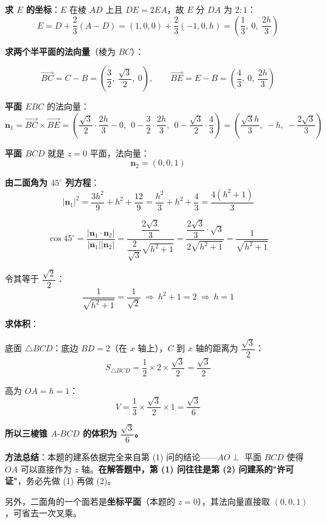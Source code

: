 \begin{answer}
\textbf{求 $E$ 的坐标}：$E$ 在棱 $AD$ 上且 $DE=2EA$，故 $E$ 分 $DA$ 为 $2:1$：
\nopagebreak[4]
\[E=D+\frac23\left(A-D\right)=(1,0,0)+\frac23(-1,0,h)=\left(\frac13,\ 0,\ \frac{2h}3\right)\]

\textbf{求两个半平面的法向量}（棱为 $BC$）：

\nopagebreak[4]
\[\overrightarrow{BC}=C-B=\left(\frac32,\ \frac{\sqrt3}2,\ 0\right),\qquad \overrightarrow{BE}=E-B=\left(\frac43,\ 0,\ \frac{2h}3\right)\]

\textbf{平面 $EBC$} 的法向量：
\nopagebreak[4]
\[\boldsymbol n_1=\overrightarrow{BC}\times\overrightarrow{BE}=\left(\frac{\sqrt3}2\cdot\frac{2h}3-0,\ \ 0-\frac32\cdot\frac{2h}3,\ \ 0-\frac{\sqrt3}2\cdot\frac43\right)=\left(\frac{\sqrt3h}3,\ -h,\ -\frac{2\sqrt3}3\right)\]

\textbf{平面 $BCD$} 就是 $z=0$ 平面，法向量：
\nopagebreak[4]
\[\boldsymbol n_2=(0,0,1)\]

\textbf{由二面角为 $45^\circ$ 列方程}：
\nopagebreak[4]
\[\left|\boldsymbol n_1\right|^{2}=\frac{3h^{2}}9+h^{2}+\frac{12}9=\frac{h^{2}}3+h^{2}+\frac43=\frac{4\left(h^{2}+1\right)}3\]

\nopagebreak[4]
\[\cos45^\circ=\frac{\left|\boldsymbol n_1\cdot\boldsymbol n_2\right|}{\left|\boldsymbol n_1\right|\left|\boldsymbol n_2\right|}=\frac{\dfrac{2\sqrt3}3}{\dfrac2{\sqrt3}\sqrt{h^{2}+1}}=\frac{\dfrac{2\sqrt3}3\cdot\sqrt3}{2\sqrt{h^{2}+1}}=\frac{1}{\sqrt{h^{2}+1}}\]

令其等于 $\dfrac{\sqrt2}2$：
\nopagebreak[4]
\[\frac1{\sqrt{h^{2}+1}}=\frac1{\sqrt2}\ \Longrightarrow\ h^{2}+1=2\ \Longrightarrow\ h=1\]

\textbf{求体积}：

底面 $\triangle BCD$：底边 $BD=2$（在 $x$ 轴上），$C$ 到 $x$ 轴的距离为 $\dfrac{\sqrt3}2$：
\nopagebreak[4]
\[S_{\triangle BCD}=\frac12\times2\times\frac{\sqrt3}2=\frac{\sqrt3}2\]

高为 $OA=h=1$：
\nopagebreak[4]
\[V=\frac13\times\frac{\sqrt3}2\times1=\frac{\sqrt3}6\]

\textbf{所以三棱锥 $A\text{-}BCD$ 的体积为 $\dfrac{\sqrt3}6$。}

\begin{gktip}
\textbf{方法总结}：本题的建系依据完全来自第 (1) 问的结论——$AO\perp$ 平面 $BCD$ 使得 $OA$ 可以直接作为 $z$ 轴。\textbf{在解答题中，第 (1) 问往往是第 (2) 问建系的"许可证"}，务必先做 (1) 再做 (2)。

另外，二面角的一个面若是\textbf{坐标平面}（本题的 $z=0$），其法向量直接取 $(0,0,1)$，可省去一次叉乘。
\end{gktip}



\par\medskip

\end{answer}
